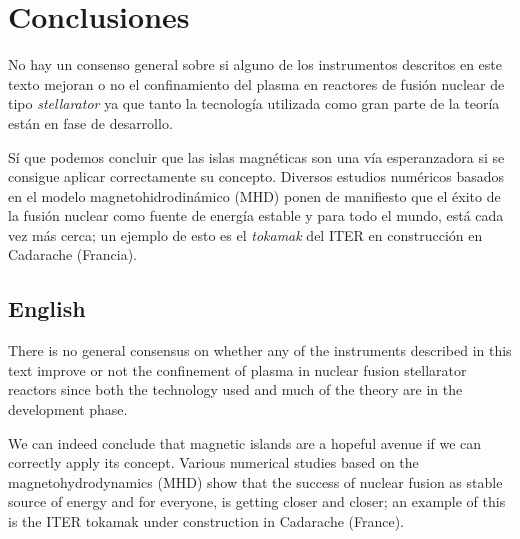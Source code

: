 \chapter{Conclusiones}
No hay un consenso general sobre si alguno de los instrumentos descritos en este
texto mejoran o no el confinamiento del plasma en reactores de fusión nuclear de tipo
\textit{stellarator} ya que tanto la tecnología utilizada como 
gran parte de la teoría están en fase de desarrollo.\par
Sí que podemos concluir que las islas magnéticas son una vía esperanzadora si se
consigue aplicar correctamente su concepto. 
Diversos estudios numéricos basados en el modelo magnetohidrodinámico (MHD)
ponen de manifiesto que el éxito de la fusión nuclear como fuente de energía
estable y para todo el mundo, está cada vez más cerca; un ejemplo de esto 
es el \textit{tokamak} del ITER en construcción en Cadarache (Francia).
\section*{English}
There is no general consensus on whether any of the instruments described in this text
improve or not the confinement of plasma in nuclear fusion stellarator reactors
since both the technology used and much of the theory are in the development phase.\par
We can indeed conclude that magnetic islands are a hopeful avenue if we can 
correctly apply its concept. Various numerical studies based on the 
magnetohydrodynamics (MHD) show that the success of nuclear fusion as
stable source of energy and for everyone, is getting closer and closer; an example of this
is the ITER tokamak under construction in Cadarache (France).